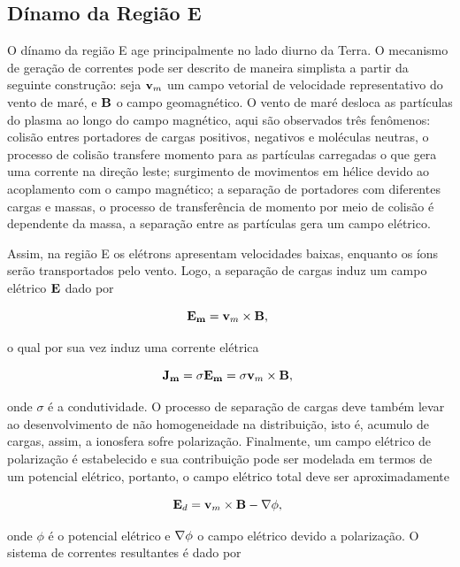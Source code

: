 \subsection{Dínamo da Região E} 

O dínamo da região E age principalmente no lado diurno da Terra. O mecanismo de geração de correntes pode ser descrito de maneira simplista a partir da seguinte construção: seja ${\bf v}_m$ um campo vetorial de velocidade representativo do vento de maré, e ${\bf B}$ o campo geomagnético. O vento de maré desloca as partículas do plasma ao longo do campo magnético, aqui são observados três fenômenos: colisão entres portadores de cargas positivos, negativos e moléculas neutras, o processo de colisão transfere momento para as partículas carregadas o que gera uma corrente na direção leste; surgimento de movimentos em hélice devido ao acoplamento com o campo magnético; a separação de portadores com diferentes cargas e massas, o processo de transferência de momento por meio de colisão é dependente da massa, a separação entre as partículas gera um campo elétrico.

Assim, na região E os elétrons apresentam velocidades baixas, enquanto os íons serão transportados pelo vento. Logo, a separação de cargas induz um campo elétrico ${\bf E}$ dado por 

\begin{equation}
{\bf E_m} = {\bf v}_m\times{\bf B}\mbox{,}~
\end{equation}

o qual por sua vez induz uma corrente elétrica

\begin{equation}
{\bf J_m}=\sigma{\bf E_m} = \sigma{\bf v}_m\times{\bf B}\mbox{,}~
\end{equation}

onde $\sigma$ é a condutividade. O processo de separação de cargas deve também levar ao desenvolvimento de não homogeneidade na distribuição, isto é, acumulo de cargas, assim, a ionosfera sofre polarização. Finalmente, um campo elétrico de polarização é estabelecido e sua contribuição pode ser modelada em termos de um potencial elétrico, portanto, o campo elétrico total deve ser aproximadamente

\begin{equation}
{\bf E}_d = {\bf v}_m\times{\bf B}-{\bf \nabla}\phi\mbox{,}~
\end{equation}

onde $\phi$ é o potencial elétrico e ${\bf \nabla}\phi$ o campo elétrico devido a polarização. O sistema de correntes resultantes é dado por

